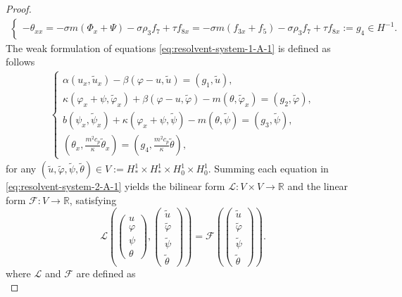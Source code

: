 \documentclass[10pt,a4paper]{amsart}
\newcommand{\dt}{\tilde}
\begin{document}
\begin{proof}
\begin{align}
\begin{cases}
			- \theta_{xx} = - \sigma m(\Phi_x + \Psi) - \sigma \rho_3 f_7 + \tau f_{8x}=- \sigma m(f_{3x} + f_5) - \sigma \rho_3 f_7 + \tau f_{8x}:=g_4 \in H^{-1}.
		\end{cases}
	\end{align}
	The weak formulation of equations \eqref{eq:resolvent-system-1-A-1} is defined as follows
	\begin{align}\label{eq:resolvent-system-2-A-1}
		\begin{cases}
			\alpha(u_x, \tilde{u}_x) - \beta(\varphi - u, \tilde{u}) = (g_1, \tilde{u}), \\
			\kappa(\varphi_x + \psi, \dt \varphi_x) + \beta(\varphi - u, \dt \varphi) - m(\theta, \dt \varphi_x) = (g_2, \dt \varphi), \\
			b(\psi_x, \dt \psi_x) + \kappa(\varphi_x + \psi, \dt \psi) - m(\theta, \dt \psi) = (g_3, \dt \psi), \\
			\left(\theta_x, \frac{m^2 c_p}{\kappa } \dt \theta_x\right) = \left(g_4, \frac{m^2 c_p}{\kappa } \dt \theta\right),
		\end{cases}
	\end{align}
	for any $(\tilde{u}, \tilde{\varphi}, \tilde{\psi}, \tilde{\theta}) \in V := H_*^1 \times H_*^1 \times H_0^1 \times H_0^1$. Summing each equation in \eqref{eq:resolvent-system-2-A-1} yields the bilinear form $\mathcal{L}: V \times V \to \mathbb{R}$ and the linear form $\mathcal{F}:V \to \mathbb{R}$, satisfying
	\begin{equation}\label{LF}
		\mathcal{L}\left(
		\begin{pmatrix}u\\ \varphi \\ \psi \\ \theta\end{pmatrix},
		\begin{pmatrix}\tilde{u}\\ \tilde{\varphi} \\ \tilde{\psi} \\ \tilde{\theta}\end{pmatrix}
		\right) = \mathcal{F}\left(
		\begin{pmatrix}\tilde{u}\\ \tilde{\varphi} \\ \tilde{\psi} \\ \tilde{\theta}\end{pmatrix}
		\right).
	\end{equation}
	where $\mathcal{L}$ and $\mathcal{F}$ are defined as
	\begin{equation}\label{L}

\end{equation}
\end{proof}
\end{document}
